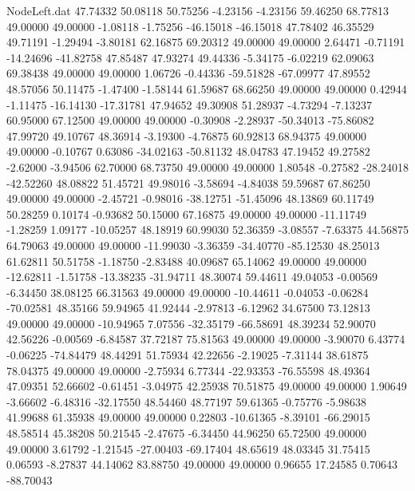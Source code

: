 \begin{filecontents}{NodeLeft.dat}
  47.74332   50.08118   50.75256    -4.23156   -4.23156   59.46250   68.77813   49.00000   49.00000   -1.08118   -1.75256  -46.15018  -46.15018
  47.78402   46.35529   49.71191    -1.29494   -3.80181   62.16875   69.20312   49.00000   49.00000    2.64471   -0.71191  -14.24696  -41.82758
  47.85487   47.93274   49.44336    -5.34175   -6.02219   62.09063   69.38438   49.00000   49.00000    1.06726   -0.44336  -59.51828  -67.09977
  47.89552   48.57056   50.11475    -1.47400   -1.58144   61.59687   68.66250   49.00000   49.00000    0.42944   -1.11475  -16.14130  -17.31781
  47.94652   49.30908   51.28937    -4.73294   -7.13237   60.95000   67.12500   49.00000   49.00000   -0.30908   -2.28937  -50.34013  -75.86082
  47.99720   49.10767   48.36914    -3.19300   -4.76875   60.92813   68.94375   49.00000   49.00000   -0.10767    0.63086  -34.02163  -50.81132
  48.04783   47.19452   49.27582    -2.62000   -3.94506   62.70000   68.73750   49.00000   49.00000    1.80548   -0.27582  -28.24018  -42.52260
  48.08822   51.45721   49.98016    -3.58694   -4.84038   59.59687   67.86250   49.00000   49.00000   -2.45721   -0.98016  -38.12751  -51.45096
  48.13869   60.11749   50.28259     0.10174   -0.93682   50.15000   67.16875   49.00000   49.00000  -11.11749   -1.28259    1.09177  -10.05257
  48.18919   60.99030   52.36359    -3.08557   -7.63375   44.56875   64.79063   49.00000   49.00000  -11.99030   -3.36359  -34.40770  -85.12530
  48.25013   61.62811   50.51758    -1.18750   -2.83488   40.09687   65.14062   49.00000   49.00000  -12.62811   -1.51758  -13.38235  -31.94711
  48.30074   59.44611   49.04053    -0.00569   -6.34450   38.08125   66.31563   49.00000   49.00000  -10.44611   -0.04053   -0.06284  -70.02581
  48.35166   59.94965   41.92444    -2.97813   -6.12962   34.67500   73.12813   49.00000   49.00000  -10.94965    7.07556  -32.35179  -66.58691
  48.39234   52.90070   42.56226    -0.00569   -6.84587   37.72187   75.81563   49.00000   49.00000   -3.90070    6.43774   -0.06225  -74.84479
  48.44291   51.75934   42.22656    -2.19025   -7.31144   38.61875   78.04375   49.00000   49.00000   -2.75934    6.77344  -22.93353  -76.55598
  48.49364   47.09351   52.66602    -0.61451   -3.04975   42.25938   70.51875   49.00000   49.00000    1.90649   -3.66602   -6.48316  -32.17550
  48.54460   48.77197   59.61365    -0.75776   -5.98638   41.99688   61.35938   49.00000   49.00000    0.22803  -10.61365   -8.39101  -66.29015
  48.58514   45.38208   50.21545    -2.47675   -6.34450   44.96250   65.72500   49.00000   49.00000    3.61792   -1.21545  -27.00403  -69.17404
  48.65619   48.03345   31.75415     0.06593   -8.27837   44.14062   83.88750   49.00000   49.00000    0.96655   17.24585    0.70643  -88.70043

\end{filecontents}
